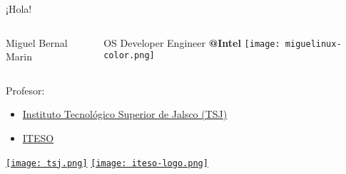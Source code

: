 
\begin{frame}[c]{¡Hola!}

  \begin{columns}
      Miguel Bernal Marin

      \vspace{\baselineskip}
      OS Developer Engineer \textbf{@Intel}
      \texttt{[image: miguelinux-color.png]}
  \end{columns}

  Profesor:
  \begin{itemize}
    \item \href{http://tsj.mx/}{Instituto Tecnológico Superior
      de Jalsco (TSJ)}
    \item \href{https://iteso.mx/}{ITESO}
  \end{itemize}

  \begin{center}
    \href{http://tecmm.edu.mx/}{\texttt{[image: tsj.png]}}
    \hspace{1cm}
    \vspace{\baselineskip}
    \vspace{\baselineskip}
    \vspace{\baselineskip}
    \vspace{\baselineskip}
    \href{https://iteso.mx/}{\texttt{[image: iteso-logo.png]}}
  \end{center}
\end{frame}
